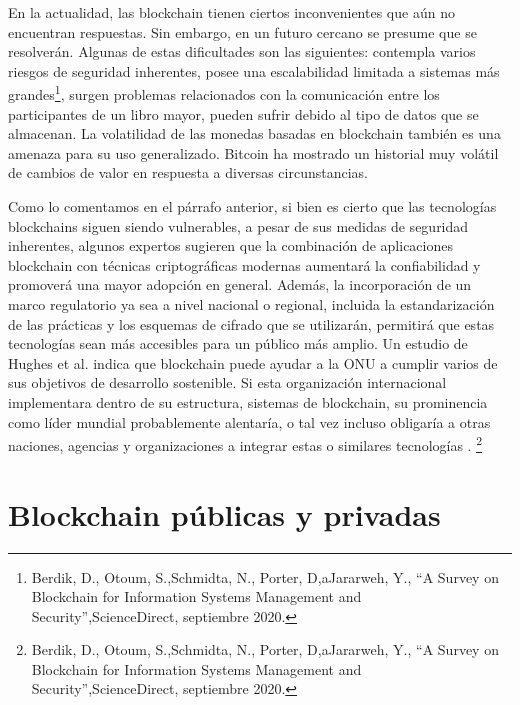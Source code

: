 \documentclass[12pt]{report} %
\begin{document}
En la actualidad, las blockchain tienen ciertos inconvenientes que aún no encuentran respuestas. Sin embargo, en un futuro cercano se presume que se resolverán. Algunas de estas dificultades son las siguientes: contempla varios riesgos de seguridad inherentes, posee una escalabilidad limitada a sistemas más grandes\footnote{Berdik, D., Otoum, S.,Schmidta, N., Porter, D,aJararweh, Y., “A Survey on Blockchain for Information Systems Management and Security”,ScienceDirect, septiembre 2020.},  surgen problemas relacionados con la comunicación entre los participantes de un libro mayor, pueden sufrir debido al tipo de datos que se almacenan. La volatilidad de las monedas basadas en blockchain también es una amenaza para su uso generalizado. Bitcoin ha mostrado un historial muy volátil de cambios de valor en respuesta a diversas circunstancias. 


Como lo comentamos en el párrafo anterior, si bien es cierto que las tecnologías blockchains siguen siendo vulnerables, a pesar de sus medidas de seguridad inherentes, algunos expertos sugieren que la combinación de aplicaciones blockchain con técnicas criptográficas modernas aumentará la confiabilidad y promoverá una mayor adopción en general. Además, la incorporación de un marco regulatorio ya sea a nivel nacional o regional, incluida la estandarización de las prácticas y los esquemas de cifrado que se utilizarán, permitirá que estas tecnologías sean más accesibles para un público más amplio.
Un estudio de Hughes et al. indica que blockchain puede ayudar a la ONU a cumplir varios de sus objetivos de desarrollo sostenible. Si esta organización internacional implementara dentro de su estructura, sistemas de blockchain, su prominencia como líder mundial probablemente alentaría, o tal vez incluso obligaría a otras naciones, agencias y organizaciones a integrar estas o similares tecnologías . \footnote{Berdik, D., Otoum, S.,Schmidta, N., Porter, D,aJararweh, Y., “A Survey on Blockchain for Information Systems Management and Security”,ScienceDirect, septiembre 2020.}

\section{Blockchain públicas y privadas}
\end{document}
